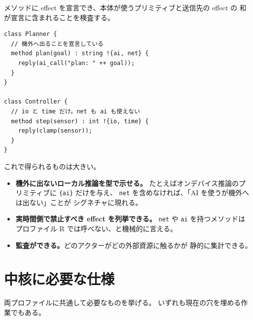 \documentclass[11pt,a4paper]{ltjsarticle}
\theoremstyle{remark}
\begin{document}
メソッドに effect を宣言でき、本体が使うプリミティブと送信先の effect の
和が宣言に含まれることを検査する。

\begin{lstlisting}[language=AIPL]
class Planner {
  // 機外へ出ることを宣言している
  method plan(goal) : string !{ai, net} {
    reply(ai_call("plan: " ++ goal));
  }
}

class Controller {
  // io と time だけ。net も ai も使えない
  method step(sensor) : int !{io, time} {
    reply(clamp(sensor));
  }
}
\end{lstlisting}

これで得られるものは大きい。

\begin{itemize}
\item \textbf{機外に出ないローカル推論を型で示せる。}
  たとえばオンデバイス推論のプリミティブに \texttt{\{ai\}} だけを与え、
  \texttt{net} を含めなければ、「AI を使うが機外へは出ない」ことが
  シグネチャに現れる。
\item \textbf{実時間側で禁止すべき effect を列挙できる。}
  \texttt{net} や \texttt{ai} を持つメソッドは
  プロファイル R では呼べない、と機械的に言える。
\item \textbf{監査ができる。}どのアクターがどの外部資源に触るかが
  静的に集計できる。
\end{itemize}

\section{中核に必要な仕様}

両プロファイルに共通して必要なものを挙げる。
いずれも現在の穴を埋める作業でもある。
\end{document}
